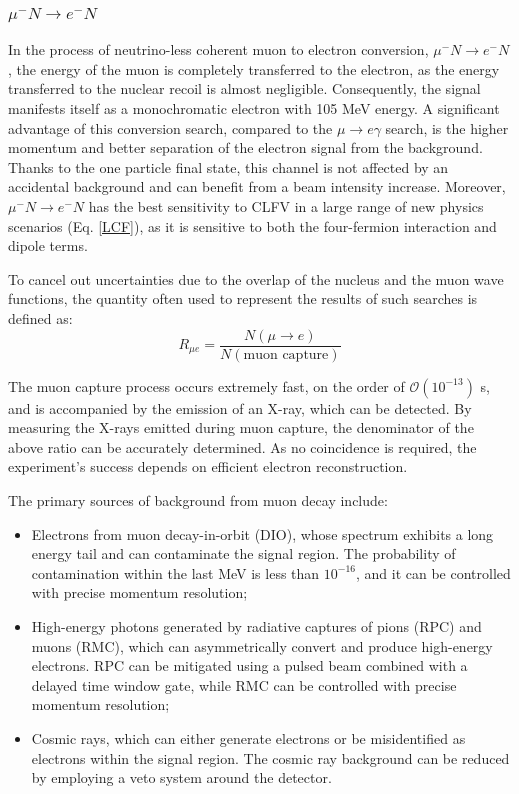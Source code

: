 \subsubsection{$\mu^- N \rightarrow e^- N $}
In the process of neutrino-less coherent muon to electron conversion, 
$\mu^- N \rightarrow e^- N$, the energy of the muon is completely 
transferred to the electron, as the energy transferred to the nuclear 
recoil is almost negligible. Consequently, the signal manifests 
itself as a monochromatic electron with 105 MeV energy. A significant 
advantage of this conversion search, compared to the 
$\mu \rightarrow e \gamma$ search, is the higher momentum 
and better separation of the electron signal from the background. 
Thanks to the one particle final state, this channel is not affected
by an accidental
background and can benefit from a beam intensity increase.
Moreover, $\mu^- N \rightarrow e^- N $ has the best sensitivity to CLFV in a large range of 
new physics scenarios (Eq. \ref{LCF}), as it is sensitive to both the four-fermion interaction and dipole terms.

To cancel out uncertainties due to the overlap of the 
nucleus and the muon wave functions, the quantity often 
used to represent the results of such searches is defined as: 
\begin{equation} 
  R_{\mu e} = \frac{N(\mu \rightarrow e)}{N(\text{muon capture})} 
\end{equation} 

The muon capture process occurs extremely fast, 
on the order of $\mathcal{O}(10^{-13})$ s, and is 
accompanied by the emission of an X-ray, which can be detected. 
By measuring the X-rays emitted during muon capture, the denominator of 
the above ratio can be accurately determined. As no coincidence 
is required, the experiment's success depends on efficient electron reconstruction.

The primary sources of background from muon decay include: 
\begin{itemize} 
  \item Electrons from muon decay-in-orbit (DIO), whose spectrum exhibits a 
      long energy tail and can contaminate the signal region. 
  The probability of 
  contamination within the last MeV is less than $10^{-16}$, 
  and it can be controlled with precise momentum resolution; 
  \item High-energy photons generated by radiative captures of pions (RPC) 
  and muons (RMC), which can asymmetrically convert and produce high-energy 
  electrons. RPC can be mitigated using a pulsed beam combined with a delayed 
  time window gate, while RMC can be controlled with precise momentum resolution;
  \item Cosmic rays, which can either generate electrons or be misidentified as 
  electrons within the signal region. The cosmic ray background can be reduced 
  by employing a veto system around the detector. 
\end{itemize}


